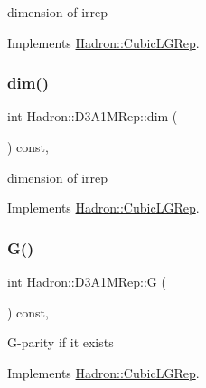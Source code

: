dimension of irrep 

Implements \mbox{\hyperlink{structHadron_1_1CubicLGRep_a3acbaea26503ed64f20df693a48e4cdd}{Hadron\+::\+Cubic\+L\+G\+Rep}}.

\mbox{\label{structHadron_1_1D3A1MRep_a312d820f56c251d8c64adff115dd1c50}} 
\subsubsection{\texorpdfstring{dim()}{dim()}\hspace{0.1cm}{\footnotesize\ttfamily [2/2]}}
{\footnotesize\ttfamily int Hadron\+::\+D3\+A1\+M\+Rep\+::dim (\begin{DoxyParamCaption}{ }\end{DoxyParamCaption}) const\hspace{0.3cm}{\ttfamily [inline]}, {\ttfamily [virtual]}}

dimension of irrep 

Implements \mbox{\hyperlink{structHadron_1_1CubicLGRep_a3acbaea26503ed64f20df693a48e4cdd}{Hadron\+::\+Cubic\+L\+G\+Rep}}.

\mbox{\label{structHadron_1_1D3A1MRep_aed0335625e2422a4694e6b30fdae9470}} 
\subsubsection{\texorpdfstring{G()}{G()}\hspace{0.1cm}{\footnotesize\ttfamily [1/2]}}
{\footnotesize\ttfamily int Hadron\+::\+D3\+A1\+M\+Rep\+::G (\begin{DoxyParamCaption}{ }\end{DoxyParamCaption}) const\hspace{0.3cm}{\ttfamily [inline]}, {\ttfamily [virtual]}}

G-\/parity if it exists 

Implements \mbox{\hyperlink{structHadron_1_1CubicLGRep_ace26f7b2d55e3a668a14cb9026da5231}{Hadron\+::\+Cubic\+L\+G\+Rep}}.

\mbox{\label{structHadron_1_1D3A1MRep_aed0335625e2422a4694e6b30fdae9470}} 
